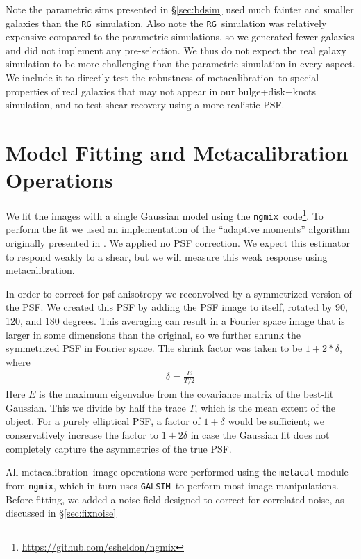 \documentclass[iop]{emulateapj}
\newcommand{\mcal}{metacalibration}
\newcommand{\ngmix}{\texttt{ngmix}}
\newcommand{\rgsim}{\texttt{RG}}
\newcommand{\galsim}{\texttt{GALSIM}}
\begin{document}
Note the parametric sims presented in \S \ref{sec:bdsim} used much fainter and
smaller galaxies than the \rgsim\ simulation.  Also note the \rgsim\ simulation
was relatively expensive compared to the parametric simulations, so we
generated fewer galaxies and did not implement any pre-selection.  We thus do
not expect the real galaxy simulation to be more challenging than the
parametric simulation in every aspect. We include it to directly test the
robustness of \mcal\ to special properties of real galaxies that may not appear
in our bulge+disk+knots simulation, and to test shear recovery using a more
realistic PSF.  


\section{Model Fitting and Metacalibration Operations} \label{sec:modelfit}

We fit the images with a single Gaussian model using the \ngmix\
code\footnote{\url{https://github.com/esheldon/ngmix}}.  To perform the fit we used an
implementation of the ``adaptive moments'' algorithm originally presented in
\cite{bj02}.   We applied no PSF correction.  We expect this estimator to
respond weakly to a shear, but we will measure this weak response using \mcal.

In order to correct for psf anisotropy  we reconvolved by a symmetrized version
of the PSF. We created this PSF by adding the PSF image to itself, rotated by
90, 120, and 180 degrees.  This averaging can result in a Fourier space image
that is larger in some dimensions than the original, so we further shrunk
the symmetrized PSF in Fourier space.  The shrink factor was taken to be
$1+2*\delta$, where
\begin{align}
    \delta = \frac{E}{T/2}
\end{align}
Here $E$ is the maximum eigenvalue from the covariance matrix of the best-fit
Gaussian. This we divide by half the trace $T$, which is the mean extent of the
object.  For a purely elliptical PSF, a factor of $1+\delta$ would be
sufficient; we conservatively increase the factor to $1+2\delta$ in case the
Gaussian fit does not completely capture the asymmetries of the true PSF.

All \mcal\ image operations were performed using the \texttt{metacal} module
from \ngmix, which in turn uses \galsim\ to perform most image manipulations.
Before fitting, we added a noise field designed to correct for correlated
noise, as discussed in \S \ref{sec:fixnoise}
\end{document}
